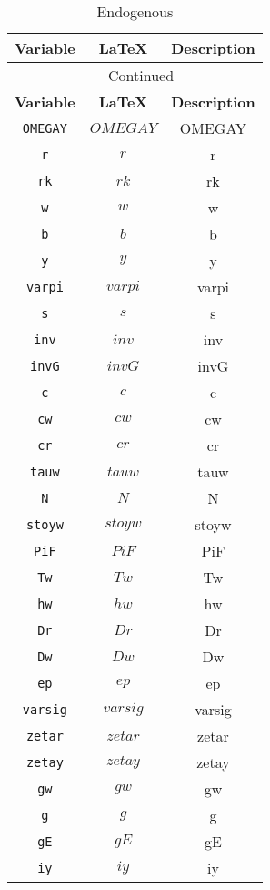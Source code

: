 \begin{center}
\begin{longtable}{ccc}
\caption{Endogenous}\\%
\hline%
\multicolumn{1}{c}{\textbf{Variable}} &
\multicolumn{1}{c}{\textbf{\LaTeX}} &
\multicolumn{1}{c}{\textbf{Description}}\\%
\hline\hline%
\endfirsthead
\multicolumn{3}{c}{{\tablename} \thetable{} -- Continued}\\%
\hline%
\multicolumn{1}{c}{\textbf{Variable}} &
\multicolumn{1}{c}{\textbf{\LaTeX}} &
\multicolumn{1}{c}{\textbf{Description}}\\%
\hline\hline%
\endhead
\texttt{OMEGAY} & $OMEGAY$ & OMEGAY\\
\texttt{r} & $r$ & r\\
\texttt{rk} & $rk$ & rk\\
\texttt{w} & $w$ & w\\
\texttt{b} & $b$ & b\\
\texttt{y} & $y$ & y\\
\texttt{varpi} & $varpi$ & varpi\\
\texttt{s} & $s$ & s\\
\texttt{inv} & $inv$ & inv\\
\texttt{invG} & $invG$ & invG\\
\texttt{c} & $c$ & c\\
\texttt{cw} & $cw$ & cw\\
\texttt{cr} & $cr$ & cr\\
\texttt{tauw} & $tauw$ & tauw\\
\texttt{N} & $N$ & N\\
\texttt{stoyw} & $stoyw$ & stoyw\\
\texttt{PiF} & $PiF$ & PiF\\
\texttt{Tw} & $Tw$ & Tw\\
\texttt{hw} & $hw$ & hw\\
\texttt{Dr} & $Dr$ & Dr\\
\texttt{Dw} & $Dw$ & Dw\\
\texttt{ep} & $ep$ & ep\\
\texttt{varsig} & $varsig$ & varsig\\
\texttt{zetar} & $zetar$ & zetar\\
\texttt{zetay} & $zetay$ & zetay\\
\texttt{gw} & $gw$ & gw\\
\texttt{g} & $g$ & g\\
\texttt{gE} & $gE$ & gE\\
\texttt{iy} & $iy$ & iy\\

\end{longtable}
\end{center}
